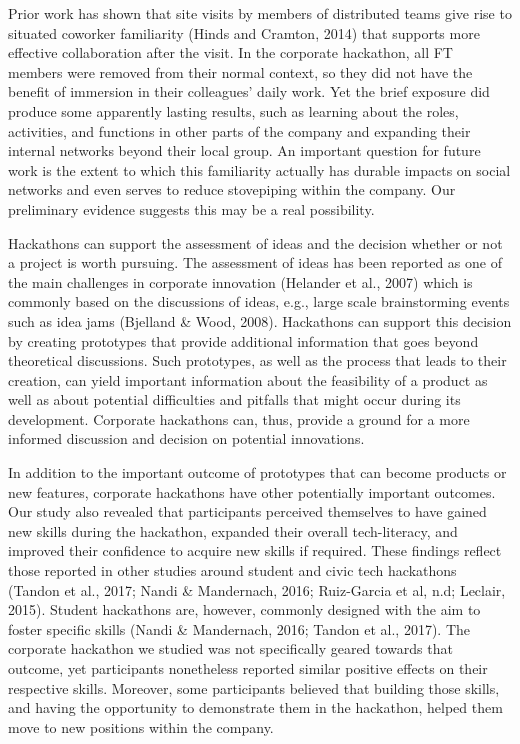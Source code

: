 \documentclass{hcij}
\begin{document}
Prior work has shown that site visits by members of distributed teams give rise to situated coworker familiarity (Hinds and Cramton, 2014) that supports more effective collaboration after the visit. In the corporate hackathon, all FT members were removed from their normal context, so they did not have the benefit of immersion in their colleagues’ daily work. Yet the brief exposure did produce some apparently lasting results, such as learning about the roles, activities, and functions in other parts of the company and expanding their internal networks beyond their local group. An important question for future work is the extent to which this familiarity actually has durable impacts on social networks and even serves to reduce stovepiping within the company. Our preliminary evidence suggests this may be a real possibility.

Hackathons can support the assessment of ideas and the decision whether or not a project is worth pursuing. The assessment of ideas has been reported as one of the main challenges in corporate innovation (Helander et al., 2007) which is commonly based on the discussions of ideas, e.g., large scale brainstorming events such as idea jams (Bjelland & Wood, 2008). Hackathons can support this decision by creating prototypes that provide additional information that goes beyond theoretical discussions. Such prototypes, as well as the process that leads to their creation, can yield important information about the feasibility of a product as well as about potential difficulties and pitfalls that might occur during its development. Corporate hackathons can, thus, provide a ground for a more informed discussion and decision on potential innovations.

In addition to the important outcome of prototypes that can become products or new features, corporate hackathons have other potentially important outcomes. Our study also revealed that participants perceived themselves to have gained new skills during the hackathon, expanded their overall tech-literacy, and improved their confidence to acquire new skills if required. These findings reflect those reported in other studies around student and civic tech hackathons (Tandon et al., 2017; Nandi & Mandernach, 2016; Ruiz-Garcia et al, n.d; Leclair, 2015). Student hackathons are, however, commonly designed with the aim to foster specific skills (Nandi & Mandernach, 2016; Tandon et al., 2017). The corporate hackathon we studied was not specifically geared towards that outcome, yet participants nonetheless reported similar positive effects on their respective skills. Moreover, some participants believed that building those skills, and having the opportunity to demonstrate them in the hackathon, helped them move to new positions within the company.
\end{document}
